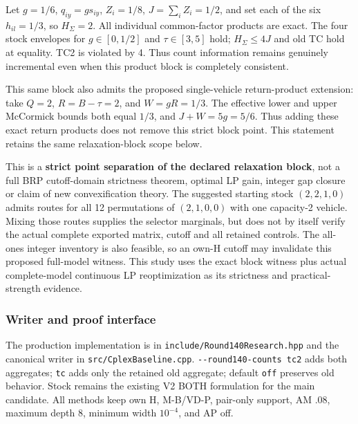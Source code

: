 \documentclass[
  american,
  11pt,
]{article}
\begin{document}
Let \(g=1/6\), \(q_{iy}=gs_{iy}\), \(Z_i=1/8\), \(J=\sum_i Z_i=1/2\),
and set each of the six \(h_{il}=1/3\), so \(H_\Sigma=2\). All
individual common-factor products are exact. The four stock envelopes
for \(g\in[0,1/2]\) and \(\tau\in[3,5]\) hold; \(H_\Sigma\le4J\) and old
TC hold at equality. TC2 is violated by 4. Thus count information
remains genuinely incremental even when this product block is completely
consistent.

This same block also admits the proposed single-vehicle return-product
extension: take \(Q=2\), \(R=B-\tau=2\), and \(W=gR=1/3\). The effective
lower and upper McCormick bounds both equal \(1/3\), and \(J+W=5g=5/6\).
Thus adding these exact return products does not remove this strict
block point. This statement retains the same relaxation-block scope
below.

This is a \textbf{strict point separation of the declared relaxation
block}, not a full BRP cutoff-domain strictness theorem, optimal LP
gain, integer gap closure or claim of new convexification theory. The
suggested starting stock \((2,2,1,0)\) admits routes for all 12
permutations of \((2,1,0,0)\) with one capacity-2 vehicle. Mixing those
routes supplies the selector marginals, but does not by itself verify
the actual complete exported matrix, cutoff and all retained controls.
The all-ones integer inventory is also feasible, so an own-H cutoff may
invalidate this proposed full-model witness. This study uses the exact
block witness plus actual complete-model continuous LP reoptimization as
its strictness and practical-strength evidence.

\subsubsection{Writer and proof
interface}\label{writer-and-proof-interface}

The production implementation is in
\texttt{include/Round140Research.hpp} and the canonical
writer in \texttt{src/CplexBaseline.cpp}.
\texttt{-\allowbreak{}-\allowbreak{}round140-\allowbreak{}counts tc2} adds both aggregates;
\texttt{tc} adds only the retained old aggregate;
default \texttt{off} preserves old behavior. Stock
remains the existing V2 BOTH formulation for the main candidate. All
methods keep own H, M-B/VD-P, pair-only support, AM .08, maximum depth
8, minimum width \(10^{-4}\), and AP off.
\end{document}
